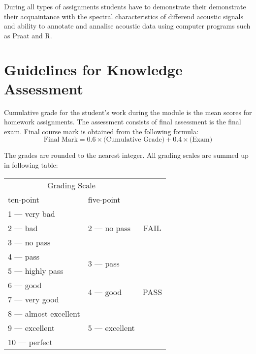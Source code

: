 \documentclass[a4paper]{article}
\begin{document}
During all types of assignments students have to demonstrate their demonstrate their acquaintance with the spectral characteristics of differend acoustic signals and ability to annotate and annalise acoustic data using computer programs such as Praat and R.

\section{Guidelines for Knowledge Assessment}
Cumulative grade for the student's work during the module is the mean scores for homework assignments. The assessment  consists of final assessment  is the final exam. Final course mark  is obtained from the following formula:
$$ \mbox{Final Mark} = 0.6 \times \mbox{(Cumulative Grade)} + 0.4 \times \mbox{(Exam)}$$
\par The grades are rounded to the nearest integer. All grading scales are summed up in following table:\\
\noindent
\begin{center}
\begin{tabular}{|l|l|c|}
\hline
\multicolumn{2}{|c|}{Grading Scale} &  \\ \cline{ 1- 2}
ten-point & five-point & \\  \hline
1 --- very bad & \multirow{3}{*}{2 --- no pass} & \multirow{3}{*}{FAIL} \\ \cline{ 1- 1}
2 --- bad  & \multicolumn{1}{c|}{} & \multicolumn{ 1}{c|}{} \\ \cline{ 1- 1}
3 --- no pass & \multicolumn{1}{c|}{} & \multicolumn{ 1}{c|}{} \\ \hline
4 --- pass & \multirow{2}{*}{3 --- pass} & \multirow{6}{*}{PASS} \\ \cline{ 1- 1}
5 --- highly pass & \multicolumn{1}{c|}{} & \multicolumn{ 1}{c|}{} \\ \cline{ 1- 2}
6 --- good & \multirow{2}{*}{4 --- good} & \multicolumn{ 1}{c|}{} \\ \cline{ 1- 1}
7 --- very good &  & \multicolumn{ 1}{c|}{} \\ \cline{ 1- 2}
8 --- almost excellent & \multirow{3}{*}{5 --- excellent} & \multicolumn{ 1}{c|}{} \\ \cline{ 1- 1}
9 --- excellent & \multicolumn{1}{c|}{} & \multicolumn{ 1}{c|}{} \\ \cline{ 1- 1}
10 --- perfect & \multicolumn{1}{c|}{} & \multicolumn{ 1}{c|}{} \\ \hline
\end{tabular}
\end{center}
\end{document}

